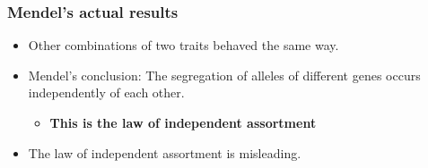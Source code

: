 \begin{frame}[t]
\begin{adjustwidth}{-1.5em}{-1.5em}
    \end{adjustwidth}
\end{frame}

\begin{frame}[t]
    \frametitle{Mendel's actual results}
    \begin{itemize}[<+->]
        \item {} Other combinations of two traits behaved the
            same way.
        \item Mendel's conclusion: The segregation of alleles of different
            genes occurs independently of each other.
            \begin{itemize}
                \item \textbf{This is the law of independent assortment}
            \end{itemize}
        \item {} The law of independent assortment is
            misleading.
    \end{itemize}

\end{frame}




\begin{frame}
    \begin{clickerquestion}
        \item 
        \begin{clickeroptions}
            \item 
            \item 
            \item 
            \item 
        \end{clickeroptions}
    \end{clickerquestion}
\end{frame}
